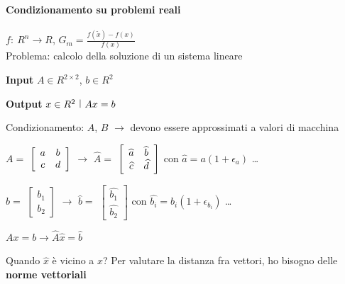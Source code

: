\documentclass[10pt]{book}
\begin{document}
\paragraph{Condizionamento su problemi reali} $f:\:R^n \rightarrow R$, $G_m = \frac{f(\tilde{x}) - f(x)}{f(x)}$\\
Problema: calcolo della soluzione di un sistema lineare
\begin{list}{}{}
	\item \textbf{Input} $A \in R^{2 \times 2}$, $b \in R^2$
	\item \textbf{Output} $x \in R^2\:\:\vline\:\:Ax = b$
\end{list}
Condizionamento: $A$, $B$ $\rightarrow$ devono essere approssimati a valori di macchina
\begin{list}{}{}
	\item $A = $
	\begin{math}
		\left[
		\begin{array}{c c}
			a & b\\
			c & d
		\end{array}
		\right]
	\end{math}
	$\rightarrow$ $\widehat{A} = $
	\begin{math}
		\left[
		\begin{array}{c c}
			\widehat{a} & \widehat{b}\\
			\widehat{c} & \widehat{d}
		\end{array}
		\right]
	\end{math}
	con $\widehat{a} = a(1 + \epsilon_a)$ \ldots
	\item $b = $
	\begin{math}
		\left[
		\begin{array}{c}
			b_1\\
			b_2
		\end{array}
		\right]
	\end{math}
	$\rightarrow$ $\widehat{b} = $
	\begin{math}
		\left[
		\begin{array}{c}
			\widehat{b_1}\\
			\widehat{b_2}
		\end{array}
		\right]
	\end{math}
	con $\widehat{b_i} = b_i(1 + \epsilon_{b_i})$ \ldots
	\item $Ax = b \rightarrow \widehat{A}\widehat{x} = \widehat{b}$
\end{list}
Quando $\widehat{x}$ è vicino a $x$? Per valutare la distanza fra vettori, ho bisogno delle \textbf{norme vettoriali}
\end{document}
